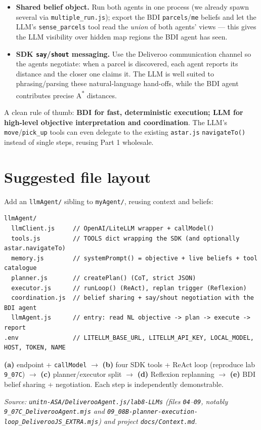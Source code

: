 \documentclass[11pt,a4paper]{article}
\begin{document}
\begin{itemize}
  \item \textbf{Shared belief object.} Run both agents in one process (we already spawn
  several via \texttt{multiple\_run.js}); export the BDI \texttt{parcels}/\texttt{me} beliefs
  and let the LLM's \texttt{sense\_parcels} tool read the \emph{union} of both agents' views ---
  this gives the LLM visibility over hidden map regions the BDI agent has seen.
  \item \textbf{SDK \texttt{say}/\texttt{shout} messaging.} Use the Deliveroo communication
  channel so the agents negotiate: when a parcel is discovered, each agent reports its distance
  and the closer one claims it. The LLM is well suited to phrasing/parsing these natural-language
  hand-offs, while the BDI agent contributes precise A\textsuperscript{*} distances.
\end{itemize}

\noindent A clean rule of thumb: \textbf{BDI for fast, deterministic execution; LLM for
high-level objective interpretation and coordination}. The LLM's \texttt{move}/\texttt{pick\_up}
tools can even delegate to the existing \texttt{astar.js} \texttt{navigateTo()} instead of single
steps, reusing Part 1 wholesale.

\section{Suggested file layout}
Add an \texttt{llmAgent/} sibling to \texttt{myAgent/}, reusing context and beliefs:

\begin{lstlisting}
llmAgent/
  llmClient.js     // OpenAI/LiteLLM wrapper + callModel()
  tools.js         // TOOLS dict wrapping the SDK (and optionally astar.navigateTo)
  memory.js        // systemPrompt() = objective + live beliefs + tool catalogue
  planner.js       // createPlan() (CoT, strict JSON)
  executor.js      // runLoop() (ReAct), replan trigger (Reflexion)
  coordination.js  // belief sharing + say/shout negotiation with the BDI agent
  llmAgent.js      // entry: read NL objective -> plan -> execute -> report
.env               // LITELLM_BASE_URL, LITELLM_API_KEY, LOCAL_MODEL, HOST, TOKEN, NAME
\end{lstlisting}

\begin{keybox}
\textbf{(a)} endpoint + \texttt{callModel} \;$\to$\; \textbf{(b)} four SDK tools + ReAct loop
(reproduce lab \texttt{9\_07C}) \;$\to$\; \textbf{(c)} planner/executor split \;$\to$\;
\textbf{(d)} Reflexion replanning \;$\to$\; \textbf{(e)} BDI belief sharing + negotiation.
Each step is independently demonstrable.
\end{keybox}

\vspace{0.3cm}
\noindent\textit{Source: \texttt{unitn-ASA/DeliverooAgent.js/lab8-LLMs} (files \texttt{04}--\texttt{09},
notably \texttt{9\_07C\_DeliverooAgent.mjs} and
\texttt{09\_08B-planner-execution-loop\_DeliverooJS\_EXTRA.mjs}) and project \texttt{docs/Context.md}.}
\end{document}
